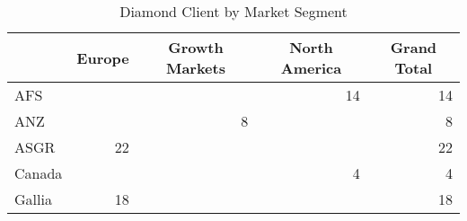 \begin{table}[]
\caption{Diamond Client by Market Segment}
\label{tab:diamond_by_segment}
\begin{tabular}{@{}lrrrr@{}}
\toprule
\rowcolor[HTML]{FFFFFF}
\multicolumn{1}{c}{\cellcolor[HTML]{FFFFFF}\textbf{Market Segment}} & \multicolumn{1}{c}{\cellcolor[HTML]{FFFFFF}\textbf{Europe}} & \multicolumn{1}{c}{\cellcolor[HTML]{FFFFFF}\textbf{Growth   Markets}} & \multicolumn{1}{c}{\cellcolor[HTML]{FFFFFF}\textbf{North   America}} & \multicolumn{1}{c}{\cellcolor[HTML]{FFFFFF}\textbf{Grand   Total}} \\ \midrule
\multicolumn{1}{l|}{AFS}                                            &                                                             &                                                                       & 14                                                                   & 14                                                                 \\
\multicolumn{1}{l|}{ANZ}                                            &                                                             & 8                                                                     &                                                                      & 8                                                                  \\
\multicolumn{1}{l|}{ASGR}                                           & 22                                                          &                                                                       &                                                                      & 22                                                                 \\
\multicolumn{1}{l|}{Canada}                                         &                                                             &                                                                       & 4                                                                    & 4                                                                  \\
\multicolumn{1}{l|}{Gallia}                                         & 18                                                          &                                                                       &                                                                      & 18                                                                 \\

\end{tabular}
\end{table}
